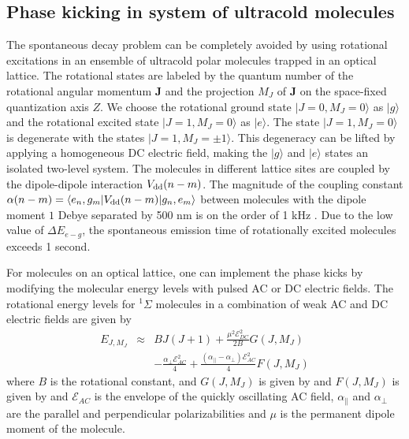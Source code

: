 \subsection{Phase kicking in system of ultracold molecules}
\label{sec:phaseKickingMolecules}

The spontaneous decay problem can be completely avoided by using rotational excitations in an ensemble of
ultracold polar molecules trapped in an optical lattice.
The rotational states are labeled by the quantum
number of the rotational angular momentum $\bm{J}$ and the
projection $M_J$ of $\bm{J}$ on the space-fixed quantization axis
$Z$. We choose the rotational ground state $|J=0, M_J=0\rangle$ as
$|g\rangle$ and the rotational excited state $|J=1, M_J = 0
\rangle$ as $|e\rangle$. The state $|J=1, M_J = 0 \rangle$ is
degenerate with the states $|J=1, M_J = \pm 1 \rangle$. This
degeneracy can be lifted by applying a homogeneous DC electric
field, making the $|g\rangle$ and $|e\rangle$ states an isolated
two-level system. The molecules in different lattice sites are
coupled by the dipole-dipole interaction $V_{\rm dd}(n-m)$.
The magnitude of
the coupling constant $\alpha(n-m) = \langle e_{n} , g_{m} |
{V}_{\rm dd}(n-m) | g_{n}, e_{m} \rangle$ between molecules with
the dipole moment $1$ Debye separated by 500 nm is on the order of
1 kHz \cite{felipe}. Due to the low value of $\Delta E_{e-g}$, the spontaneous emission time of
rotationally excited molecules  exceeds 1 second.


For molecules on an optical lattice, one can implement the phase
kicks by modifying the molecular energy levels with pulsed AC or
DC electric fields. The rotational energy levels for $^1\Sigma$
molecules in a combination of weak AC and DC electric fields are
given by \cite{friedrich-95}
\begin{eqnarray}
E_{J,M_J}  &\approx&  BJ(J+1) +  \frac{\mu^2 \mathcal{E}_{DC}^2
}{2B} G(J,M_J) \nonumber \\
&& - \frac{ \alpha_{\perp}\mathcal{E}_{AC}^2 }{4} + \frac{
(\alpha_{||}-\alpha_{\perp})\mathcal{E}_{AC}^2 }{4}F(J,M_J)
 \label{DressedEnery-Sum}
\end{eqnarray}
%
where $B$ is the rotational constant,  and $G(J, M_J)$ is given by
and $F(J, M_J)$ is given by
and $\mathcal{E}_{AC}$ is the
envelope of the quickly oscillating AC field, $\alpha_\|$ and
$\alpha_{\perp}$ are the parallel and perpendicular
polarizabilities and $\mu$ is the permanent dipole moment of the
molecule.

